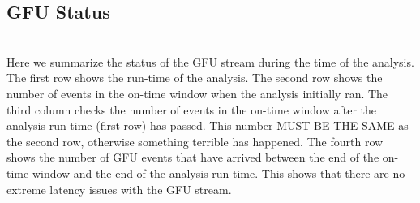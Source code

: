 \documentclass[titlepage]{article}
\begin{document}
\subsection{GFU Status}
\GFUstatus
\\
\vspace{1cm}
Here we summarize the status of the GFU stream during the time of the analysis.
\\
The first row shows the run-time of the analysis.
The second row shows the number of events in the on-time window when the analysis initially ran.
The third column checks the number of events in the on-time window after the analysis run time (first row) has passed. This number MUST BE THE SAME as the second row, otherwise something terrible has happened.
The fourth row shows the number of GFU events that have arrived between the end of the on-time window and the end of the analysis run time. This shows that there are no extreme latency issues with the GFU stream.
\end{document}
